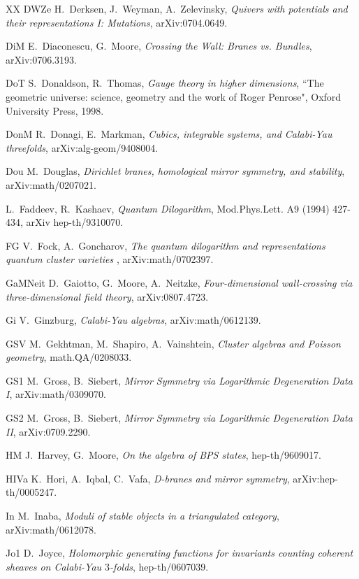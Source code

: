 \documentclass[12pt]{article}
\begin{document}
\begin{thebibliography}{XX}
\bibitem
 {DWZe} H.~Derksen, J.~Weyman, A.~Zelevinsky, {\it Quivers with potentials and their representations I: Mutations},
arXiv:0704.0649.



\bibitem
 {DiM} E.~Diaconescu, G.~Moore, {\it Crossing the Wall: Branes vs. Bundles}, arXiv:0706.3193.

\bibitem
 {DoT} S.~Donaldson, R.~Thomas, {\it Gauge theory in higher dimensions},  ``The geometric universe:
science, geometry and the work of Roger Penrose", Oxford University Press, 1998.

\bibitem
 {DonM} R.~Donagi, E.~Markman, {\it Cubics, integrable systems, and Calabi-Yau threefolds}, arXiv:alg-geom/9408004.


\bibitem
{Dou} M.~Douglas, {\it Dirichlet branes, homological mirror symmetry, and stability}, arXiv:math/0207021.


 L.~Faddeev, R.~Kashaev, {\it Quantum Dilogarithm}, Mod.Phys.Lett. A9 (1994) 427-434, arXiv hep-th/9310070.

\bibitem
 {FG} V.~Fock, A.~Goncharov, {\it The quantum dilogarithm and representations quantum cluster varieties } , arXiv:math/0702397.



\bibitem
 {GaMNeit} D.~Gaiotto, G.~Moore, A.~Neitzke, {\it Four-dimensional wall-crossing via three-dimensional field theory},
arXiv:0807.4723.


\bibitem
{Gi} V.~Ginzburg, {\it Calabi-Yau algebras}, arXiv:math/0612139.


\bibitem
  {GSV} M.~Gekhtman, M.~Shapiro, A.~Vainshtein, {\it Cluster algebras and Poisson geometry},
math.QA/0208033.


\bibitem
 {GS1} M.~Gross, B.~Siebert, {\it Mirror Symmetry via Logarithmic Degeneration Data I},
arXiv:math/0309070.


\bibitem
 {GS2} M.~Gross, B.~Siebert, {\it Mirror Symmetry via Logarithmic Degeneration Data II},
 arXiv:0709.2290.


\bibitem
 {HM} J.~Harvey, G.~Moore, {\it On the algebra of BPS states}, hep-th/9609017.


\bibitem
 {HIVa} K.~Hori, A.~Iqbal, C.~Vafa, {\it D-branes and mirror symmetry}, arXiv:hep-th/0005247.


\bibitem
 {In} M.~Inaba, {\it  Moduli of stable objects in a triangulated category}, arXiv:math/0612078.



\bibitem
 {Jo1} D.~Joyce, {\it Holomorphic generating functions for invariants counting
coherent sheaves on Calabi-Yau $3$-folds}, hep-th/0607039.




\end{thebibliography}
\end{document}
